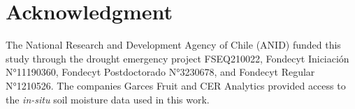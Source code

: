 \documentclass[
  authoryear,
  preprint,
  3p,
  onecolumn]{elsarticle}
\begin{document}
\hypertarget{acknowledgment}{%
\section{Acknowledgment}\label{acknowledgment}}

The National Research and Development Agency of Chile (ANID) funded this
study through the drought emergency project FSEQ210022, Fondecyt
Iniciación N°11190360, Fondecyt Postdoctorado N°3230678, and Fondecyt
Regular N°1210526. The companies Garces Fruit and CER Analytics provided
access to the \emph{in-situ} soil moisture data used in this work.


\renewcommand\refname{References}
  
\end{document}
